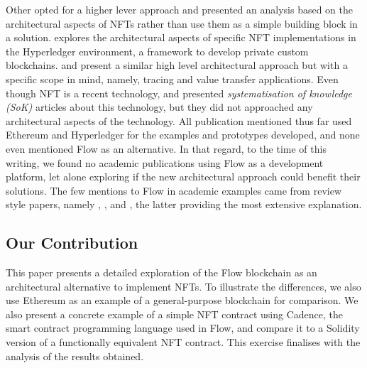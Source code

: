 \documentclass[../access.tex]{subfiles}
\begin{document}
Other opted for a higher lever approach and presented an analysis based on the architectural aspects of NFTs rather than use them as a simple building block in a solution. \cite{Hong2019} explores the architectural aspects of specific NFT implementations in the Hyperledger environment, a framework to develop private custom blockchains. \cite{Yang2022} and \cite{Bal2019} present a similar high level architectural approach but with a specific scope in mind, namely, tracing and value transfer applications. Even though NFT is a recent technology, \cite{Wang2021b} and \cite{Ma2023} presented \textit{systematisation of knowledge (SoK)} articles about this technology, but they did not approached any architectural aspects of the technology. All publication mentioned thus far used Ethereum and Hyperledger for the examples and prototypes developed, and none even mentioned Flow as an alternative. In that regard, to the time of this writing, we found no academic publications using Flow as a development platform, let alone exploring if the new architectural approach could benefit their solutions. The few mentions to Flow in academic examples came from review style papers, namely \cite{Wang2021}, \cite{Razi2024}, and \cite{Guidi2023}, the latter providing the most extensive explanation.

\subsection{Our Contribution}
This paper presents a detailed exploration of the Flow blockchain as an architectural alternative to implement NFTs. To illustrate the differences, we also use Ethereum as an example of a general-purpose blockchain for comparison. We also present a concrete example of a simple NFT contract using Cadence, the smart contract programming language used in Flow, and compare it to a Solidity version of a functionally equivalent NFT contract. This exercise finalises with the analysis of the results obtained.
\end{document}
